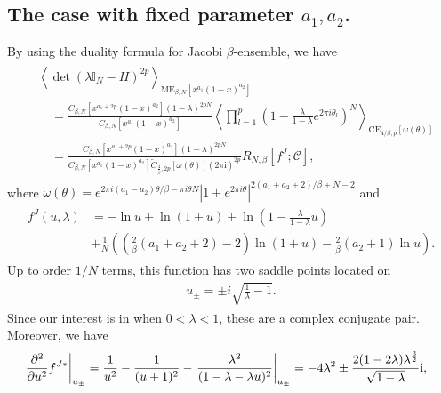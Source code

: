 \documentclass[11pt,a4paper]{article}
\numberwithin{equation}{section} %
\theoremstyle{plain}
\theoremstyle{definition}
\numberwithin{prop}{section}
\numberwithin{cor}{section}
\numberwithin{remark}{section}
\begin{document}
\subsection{The case with fixed parameter $a_1,a_2$.}
By using the duality formula \cite[eq. (3.15)]{Fo25+} for Jacobi $\beta$-ensemble, we have
\begin{align}\label{dua-for-J1}
    \begin{aligned}
& \left\langle\operatorname{det}\left(\lambda \mathbb{I}_N-H\right)^{2p}\right\rangle_{\mathrm{ME}_{\beta, N}\left[x^{a_1}(1-x)^{a_2}\right]} \\
& \quad =\frac{C_{\beta,N}[x^{a_1+2p}(1-x)^{a_2}](1-\lambda)^{2p N}}{C_{\beta,N}[x^{a_1}(1-x)^{a_2}]}\left\langle\prod_{l=1}^p\left(1-\frac{\lambda}{1-\lambda} e^{2 \pi i \theta_l}\right)^N\right\rangle_{\mathrm{CE}_{4 / \beta, p}\left[\omega(\theta)\right]}\\
&\quad =\frac{C_{\beta,N}[x^{a_1+2p}(1-x)^{a_2}](1-\lambda)^{2p N}}{C_{\beta,N}[x^{a_1}(1-x)^{a_2}]\tilde{C}_{\frac{4}{\beta},2p}[\omega(\theta)](2\pi \mathrm{i})^{2p}}R_{N,\beta}[f^J;\mathcal{C}],
\end{aligned}
\end{align}
where $\omega(\theta)=e^{2 \pi i\left(a_1-a_2\right) \theta / \beta-\pi i \theta N}\left|1+e^{2 \pi i \theta}\right|^{2\left(a_1+a_2+2\right) / \beta+N-2}$ and 
\begin{align*}
    \begin{aligned}
f^J(u,\lambda)& =-\ln u+\ln (1+u)+\ln \left(1-\frac{\lambda}{1-\lambda} u\right) \\
& +\frac{1}{N}\left(\left(\frac{2}{\beta}\left(a_1+a_2+2\right)-2\right) \ln (1+u)-\frac{2}{\beta}\left(a_2+1\right) \ln u\right).
\end{aligned}
\end{align*}
Up to order $1/N$ terms, this function has two saddle points located on
\begin{align}
    u_{ \pm}= \pm i \sqrt{\frac{1}{\lambda}-1}.
\end{align}
Since our interest is in when $0<\lambda<1$, these are a complex conjugate pair.
Moreover, we have
\begin{align*}
    \begin{aligned}
& \left.\frac{\partial^2}{\partial u^2}f^{J*}\right|_{u_\pm}=\frac{1}{u^2}-\frac{1}{(u+1)^2}-\left.\frac{\lambda^2}{(1-\lambda-\lambda u)^2}\right|_{u_{ \pm}}=-4 \lambda^2 \pm \frac{2(1-2 \lambda) \lambda^{3\over 2}}{\sqrt{1-\lambda}} \mathrm{i},
\end{aligned}
\end{align*}
\end{document}
